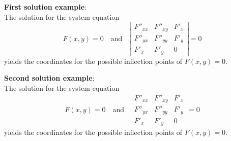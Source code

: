 \documentclass{article}
\begin{document}
\noindent\textbf{First solution example}:\\[1ex]
The solution for the system equation
\[ \renewcommand{\arraystretch}{1.2}
   F(x,y) = 0\quad\mbox{and}\quad
   \left|\begin{array}{ccc}
     F''_{xx} & F''_{xy} & F'_x\\
     F''_{yx} & F''_{yy} & F'_y\\
     F'_x     & F'_y     & 0
   \end{array}\right| = 0     
\]
yields the coordinates for the possible inflection points of $F(x,y) = 0$.

\bigskip
\noindent\textbf{Second solution example}:\\[1ex]
The solution for the system equation
\[ \renewcommand{\arraystretch}{1.2}
   F(x,y) = 0\quad\mbox{and}\quad\begin{array}{|ccc|}
   F''_{xx} & F''_{xy} & F'_x\\
   F''_{yx} & F''_{yy} & F'_y\\
   F'_x     & F'_y     & 0
  \end{array} = 0     
\]
yields the coordinates for the possible inflection points of $F(x,y) = 0$.
\end{document}
